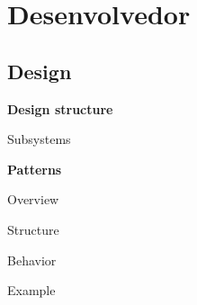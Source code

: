 \documentclass[12pt,letterpaper]{article}
\begin{document}
\section{Desenvolvedor}

\subsection{Design}

\vspace{1cm}
{\large {\bf Design structure}}
\vspace{0.5cm}


Subsystems





\vspace{1cm}
{\large {\bf Patterns}}
\vspace{0.5cm}


Overview


Structure


Behavior


Example
\end{document}
